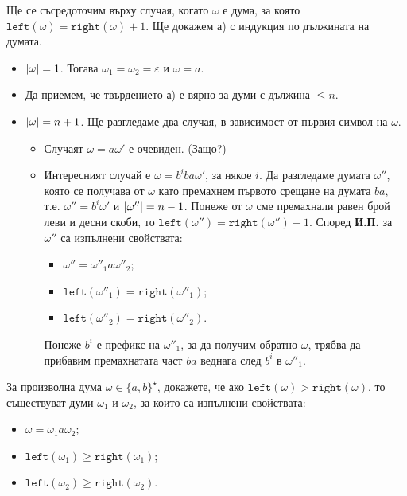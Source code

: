 \begin{hint}
  Ще се съсредоточим върху случая, когато $\omega$ е дума, за която $\texttt{left}(\omega) = \texttt{right}(\omega) + 1$.
  Ще докажем а) с индукция по дължината на думата.
  \begin{itemize}
  \item 
    $\vert{\omega}\vert = 1$. Тогава $\omega_1 = \omega_2 = \varepsilon$ и $\omega = a$.
  \item
    Да приемем, че твърдението а) е вярно за думи с дължина $\leq n$.
  \item
    $\vert{\omega}\vert = n+1$. Ще разгледаме два случая, в зависимост от първия символ на $\omega$.
    \begin{itemize}
    \item 
      Случаят $\omega = a\omega'$ е очевиден. (Защо?)
    \item
      Интересният случай е $\omega = b^i ba \omega'$, за някое $i$.
      Да разгледаме думата $\omega''$, която се получава от $\omega$
      като премахнем първото срещане на думата $ba$, т.е. 
      $\omega'' = b^i\omega'$ и $\vert{\omega''}\vert = n-1$.
      Понеже от $\omega$ сме премахнали равен брой леви и десни скоби, то
      $\texttt{left}(\omega'') = \texttt{right}(\omega'')+1$.
      Според {\bf И.П.} за $\omega''$ са изпълнени свойствата:
      \begin{itemize}
      \item 
        $\omega'' = \omega''_1 a \omega''_2$;
      \item
        $\texttt{left}(\omega''_1) = \texttt{right}(\omega''_1)$;
      \item
        $\texttt{left}(\omega''_2) = \texttt{right}(\omega''_2)$.
      \end{itemize}
      Понеже $b^i$ е префикс на $\omega''_1$, за да получим обратно $\omega$, трябва 
      да прибавим премахнатата част $ba$ веднага след $b^i$ в $\omega''_1$.
    \end{itemize}
  \end{itemize}
\end{hint}

\begin{problem}
  За произволна дума $\omega \in \{ a,b \}^\star$, 
  докажете, че ако $\texttt{left}(\omega) > \texttt{right}(\omega)$, то съществуват думи $\omega_1$ и $\omega_2$,
  за които са изпълнени свойствата:
  \begin{itemize}
  \item 
    $\omega = \omega_1 a \omega_2$;
  \item
    $\texttt{left}(\omega_1) \geq \texttt{right}(\omega_1)$;
  \item
    $\texttt{left}(\omega_2) \geq \texttt{right}(\omega_2)$.
  \end{itemize}
\end{problem}

